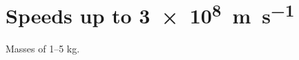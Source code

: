 \documentclass{article}
\begin{document}
\section{Speeds up to \qty{3e8}{\metre\per\second}}
Masses of \numrange{1}{5} \unit{\kilo\gram}.
\end{document}
